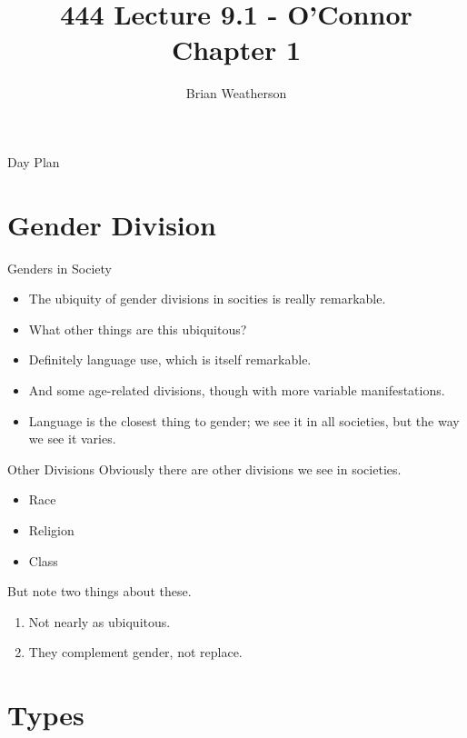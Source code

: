 \documentclass[
  ignorenonframetext,
]{beamer}
\title{444 Lecture 9.1 - O'Connor Chapter 1}
\author{Brian Weatherson}
\date{}
\providecommand{\tightlist}{%
  \setlength{\itemsep}{0pt}\setlength{\parskip}{0pt}}
\begin{document}
\frame{\titlepage}

\begin{frame}{Day Plan}
\protect\hypertarget{day-plan}{}
\tableofcontents
\end{frame}

\hypertarget{gender-division}{%
\section{Gender Division}\label{gender-division}}

\begin{frame}{Genders in Society}
\protect\hypertarget{genders-in-society}{}
\begin{itemize}
\tightlist
\item
  The ubiquity of gender divisions in socities is really remarkable.
\item
  What other things are this ubiquitous? \pause
\item
  Definitely language use, which is itself remarkable.
\item
  And some age-related divisions, though with more variable
  manifestations. \pause
\item
  Language is the closest thing to gender; we see it in all societies,
  but the way we see it varies.
\end{itemize}
\end{frame}

\begin{frame}{Other Divisions}
\protect\hypertarget{other-divisions}{}
Obviously there are other divisions we see in societies.

\begin{itemize}
\tightlist
\item
  Race
\item
  Religion
\item
  Class \pause
\end{itemize}

But note two things about these.

\begin{enumerate}
\tightlist
\item
  Not nearly as ubiquitous.
\item
  They complement gender, not replace.
\end{enumerate}
\end{frame}

\hypertarget{types}{%
\section{Types}\label{types}}
\end{document}
